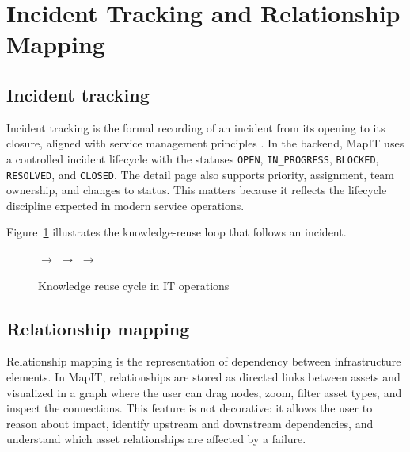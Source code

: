 \section{Incident Tracking and Relationship Mapping}
\subsection{Incident tracking}
Incident tracking is the formal recording of an incident from its opening to its closure, aligned with service management principles \cite{itil4,iso20000,atlassian_incident}. In the backend, MapIT uses a controlled incident lifecycle with the statuses \texttt{OPEN}, \texttt{IN\_PROGRESS}, \texttt{BLOCKED}, \texttt{RESOLVED}, and \texttt{CLOSED}. The detail page also supports priority, assignment, team ownership, and changes to status. This matters because it reflects the lifecycle discipline expected in modern service operations.

Figure~\ref{fig:incident-flow} illustrates the knowledge-reuse loop that follows an incident.

\begin{figure}[H]
\centering
	\hspace{0.2cm}$\rightarrow$\hspace{0.2cm}
	\hspace{0.2cm}$\rightarrow$\hspace{0.2cm}
	\hspace{0.2cm}$\rightarrow$\hspace{0.2cm}
	\caption{Knowledge reuse cycle in IT operations}
\label{fig:incident-flow}
\end{figure}

\subsection{Relationship mapping}
Relationship mapping is the representation of dependency between infrastructure elements. In MapIT, relationships are stored as directed links between assets and visualized in a graph where the user can drag nodes, zoom, filter asset types, and inspect the connections. This feature is not decorative: it allows the user to reason about impact, identify upstream and downstream dependencies, and understand which asset relationships are affected by a failure.


